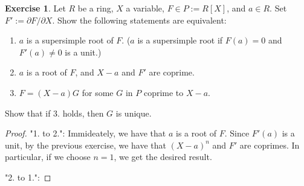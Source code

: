 \documentclass{book}
\theoremstyle{plain}
\theoremstyle{definition}
\newtheorem{exr}[thm]{Exercise}
\theoremstyle{custom_definition}
\begin{document}
\begin{exr}
  Let \(R\) be a ring, \(X\) a variable, \(F \in P := R[X]\), and \(a \in R\). Set \(F' := \partial F / \partial X\). Show the following statements are equivalent:
  \begin{enumerate}
    \item \(a\) is a supersimple root of \(F\). (\(a\) is a supersimple root if \(F(a) = 0\) and \(F'(a) \neq 0\) is a unit.)
    \item \(a\) is a root of \(F\), and \(X - a\) and \(F'\) are coprime.
    \item \(F = (X - a)G\) for some \(G\) in \(P\) coprime to \(X - a\).
  \end{enumerate}
  Show that if 3. holds, then \(G\) is unique.
\end{exr}

\begin{proof}
  "1. to 2.": Immideately, we have that \(a\) is a root of \(F\). Since \(F'(a)\) is a unit, by the previous exercise, we have that \((X - a)^n\) and \(F'\) are coprimes. In particular, if we choose \(n = 1\), we get the desired result.

  "2. to 1.":
\end{proof}
\end{document}
